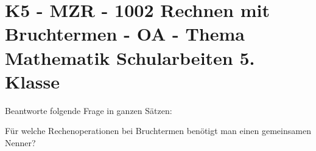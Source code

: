 \section{K5 - MZR - 1002 Rechnen mit Bruchtermen - OA - Thema Mathematik Schularbeiten 5. Klasse}

\begin{beispiel}[K5 - MZR]{1} %
Beantworte folgende Frage in ganzen Sätzen:

Für welche Rechenoperationen bei Bruchtermen benötigt man einen gemeinsamen Nenner?

\end{beispiel}